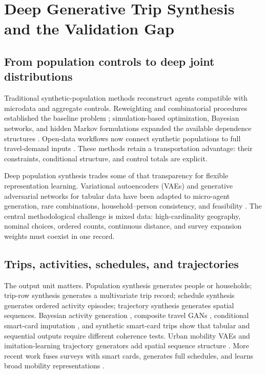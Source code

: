 \documentclass[numbered]{trbunofficial}
\begin{document}
\section{Deep Generative Trip Synthesis and the Validation Gap}

\subsection{From population controls to deep joint distributions}

Traditional synthetic-population methods reconstruct agents compatible with microdata and aggregate controls. Reweighting and combinatorial procedures established the baseline problem \cite{beckman1996creating}; simulation-based optimization, Bayesian networks, and hidden Markov formulations expanded the available dependence structures \cite{farooq2013simulation,sun2015bayesian,saadi2016hidden}. Open-data workflows now connect synthetic populations to full travel-demand inputs \cite{horl2021paris}. These methods retain a transportation advantage: their constraints, conditional structure, and control totals are explicit.

Deep population synthesis trades some of that transparency for flexible representation learning. Variational autoencoders (VAEs) \cite{kingma2014vae} and generative adversarial networks for tabular data \cite{xu2019ctgan} have been adapted to micro-agent generation, rare combinations, household--person consistency, and feasibility \cite{borysov2019microagents,garrido2020rare,aemmer2022joint,kim2023feasible}. The central methodological challenge is mixed data: high-cardinality geography, nominal choices, ordered counts, continuous distance, and survey expansion weights must coexist in one record.

\subsection{Trips, activities, schedules, and trajectories}

The output unit matters. Population synthesis generates people or households; trip-row synthesis generates a multivariate trip record; schedule synthesis generates ordered activity episodes; trajectory synthesis generates spatial sequences. Bayesian activity generation \cite{joubert2020bayesian}, composite travel GANs \cite{badumarfo2022composite}, conditional smart-card imputation \cite{kim2022tripchains}, and synthetic smart-card trips \cite{kieu2023smartcard} show that tabular and sequential outputs require different coherence tests. Urban mobility VAEs and imitation-learning trajectory generators add spatial sequence structure \cite{huang2019urbanvae,choi2021trajgail}. More recent work fuses surveys with smart cards, generates full schedules, and learns broad mobility representations \cite{lee2025collagan,shone2025scheduling,ma2025foundation,liao2026deepactivity,lu2026pop2actloc}.
\end{document}
